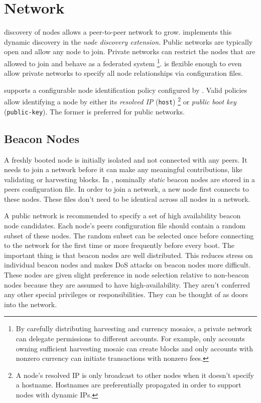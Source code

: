 \section{Network}
\label{sec:network}


 discovery of nodes allows a peer-to-peer network to grow.
\codenamespace implements this dynamic discovery in the \emph{node discovery extension}.
Public networks are typically open and allow any node to join.
Private networks can restrict the nodes that are allowed to join and behave as a federated system
\footnote{
	By carefully distributing harvesting and currency mosaics, a private network can delegate permissions to different accounts.
	For example, only accounts owning sufficient harvesting mosaic can create blocks and only accounts with nonzero currency can initiate transactions with nonzero fees.
}.
\codenamespace is flexible enough to even allow private networks to specify all node relationships via configuration files.

\codenamespace supports a configurable node identification policy configured by .
Valid policies allow identifying a node by either its \emph{resolved IP} (\texttt{host})
\footnote{
	A node's resolved IP is only broadcast to other nodes when it doesn't specify a hostname.
	Hostnames are preferentially propagated in order to support nodes with dynamic IPs.
} or \emph{public boot key} (\texttt{public-key}).
The former is preferred for public networks.

\subsection{Beacon Nodes}

A freshly booted node is initially isolated and not connected with any peers.
It needs to join a network before it can make any meaningful contributions, like validating or harvesting blocks.
In \codename, nominally \emph{static} beacon nodes are stored in a peers configuration file.
In order to join a network, a new node first connects to these nodes.
These files don't need to be identical across all nodes in a network.

A public network is recommended to specify a set of high availability beacon node candidates.
Each node's peers configuration file should contain a random subset of these nodes.
The random subset can be selected once before connecting to the network for the first time or more frequently before every boot.
The important thing is that beacon nodes are well distributed.
This reduces stress on individual beacon nodes and makes DoS attacks on beacon nodes more difficult.
These nodes are given slight preference in node selection  relative to non-beacon nodes because they are assumed to have high-availability.
They aren't conferred any other special privileges or responsibilities.
They can be thought of as doors into the network.

